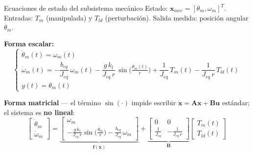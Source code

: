 \documentclass[aspectratio=169,t]{beamer}
\begin{document}
\begin{frame}{Ecuaciones de estado del subsistema mecánico}
{\small\color{uncGray}Estado: $\bm{x}_{mec}=[\theta_m,\omega_m]^T$. Entradas: $T_m$ (manipulada) y $T_{ld}$ (perturbación). Salida medida: posición angular $\theta_m$.}\par
\vspace{2mm}

\textbf{Forma escalar:}
\begin{equation*}
\begin{cases}
\dot{\theta}_m(t) = \omega_m(t) \\[4pt]
\dot{\omega}_m(t) = -\dfrac{b_{eq}}{J_{eq}}\,\omega_m(t) -\dfrac{g\,k_l}{J_{eq}\,r}\,\sin\!\big(\tfrac{\theta_m(t)}{r}\big) +\dfrac{1}{J_{eq}}\,T_m(t) -\dfrac{1}{J_{eq}\,r}\,T_{ld}(t) \\[6pt]
y(t) = \theta_m(t)
\end{cases}
\end{equation*}

\vspace{2mm}
\textbf{Forma matricial} --- el término $\sin(\cdot)$ impide escribir $\dot{\bm{x}}=\bm{A}\bm{x}+\bm{B}\bm{u}$ estándar; el sistema es \textbf{no lineal}:
\begin{equation*}
\begin{bmatrix}\dot{\theta}_m \\ \dot{\omega}_m\end{bmatrix} =
\underbrace{\begin{bmatrix}\omega_m \\[2pt] -\tfrac{g\,k_l}{J_{eq}\,r}\sin\!\big(\tfrac{\theta_m}{r}\big) -\tfrac{b_{eq}}{J_{eq}}\,\omega_m\end{bmatrix}}_{\bm{f}(\bm{x})}
+
\underbrace{\begin{bmatrix}0 & 0 \\[2pt] \tfrac{1}{J_{eq}} & -\tfrac{1}{J_{eq}\,r}\end{bmatrix}}_{\bm{B}}
\begin{bmatrix}T_m(t) \\ T_{ld}(t)\end{bmatrix}
\end{equation*}
\end{frame}

\end{document}
